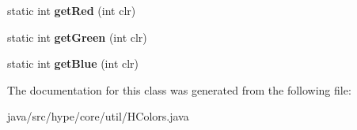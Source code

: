 \begin{DoxyCompactItemize}
\item 
\hypertarget{classhype_1_1core_1_1util_1_1_h_colors_a8e7a37a4e014078f84014ef97c3a4ce9}{static int {\bfseries get\-Red} (int clr)}\label{classhype_1_1core_1_1util_1_1_h_colors_a8e7a37a4e014078f84014ef97c3a4ce9}

\item 
\hypertarget{classhype_1_1core_1_1util_1_1_h_colors_a48ea544be73650414dcd56a112a04bfe}{static int {\bfseries get\-Green} (int clr)}\label{classhype_1_1core_1_1util_1_1_h_colors_a48ea544be73650414dcd56a112a04bfe}

\item 
\hypertarget{classhype_1_1core_1_1util_1_1_h_colors_a1800020b2bae22dc75a0b13f02c23d8f}{static int {\bfseries get\-Blue} (int clr)}\label{classhype_1_1core_1_1util_1_1_h_colors_a1800020b2bae22dc75a0b13f02c23d8f}

\end{DoxyCompactItemize}


The documentation for this class was generated from the following file\-:\begin{DoxyCompactItemize}
\item 
java/src/hype/core/util/H\-Colors.\-java\end{DoxyCompactItemize}
